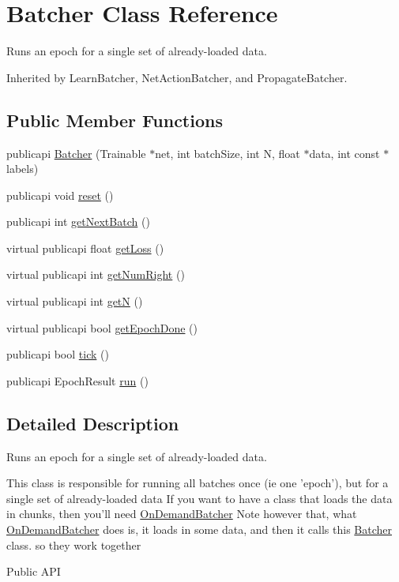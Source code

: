 \hypertarget{classBatcher}{\section{Batcher Class Reference}
\label{classBatcher}
}


Runs an epoch for a single set of already-\/loaded data.  




Inherited by Learn\-Batcher, Net\-Action\-Batcher, and Propagate\-Batcher.

\subsection*{Public Member Functions}
\begin{DoxyCompactItemize}
\item 
publicapi \hyperlink{classBatcher_a4a53928e1ea4f752953ea43ab7faa0e8}{Batcher} (Trainable $\ast$net, int batch\-Size, int N, float $\ast$data, int const $\ast$labels)
\item 
publicapi void \hyperlink{classBatcher_a0f3c13ade8b4840d87a43167a7341070}{reset} ()
\item 
publicapi int \hyperlink{classBatcher_ab26dca3a4d002664f0a13c68ddc65ced}{get\-Next\-Batch} ()
\item 
virtual publicapi float \hyperlink{classBatcher_afaafa92c67a361127079ba8b3003e0f2}{get\-Loss} ()
\item 
virtual publicapi int \hyperlink{classBatcher_a5426a711b8a6989f57fa1c6dad2e1138}{get\-Num\-Right} ()
\item 
virtual publicapi int \hyperlink{classBatcher_ae1bcb776d55a399fc91ef70b43b753d5}{get\-N} ()
\item 
virtual publicapi bool \hyperlink{classBatcher_a9f71c218e242b55bcd490379cc20e7ac}{get\-Epoch\-Done} ()
\item 
publicapi bool \hyperlink{classBatcher_afb1f812a7b9b3e45ae57d235c912d754}{tick} ()
\item 
publicapi Epoch\-Result \hyperlink{classBatcher_a51d5f36d326bdc32926abd8aa5b0d22e}{run} ()
\end{DoxyCompactItemize}


\subsection{Detailed Description}
Runs an epoch for a single set of already-\/loaded data. 

This class is responsible for running all batches once (ie one 'epoch'), but for a single set of already-\/loaded data If you want to have a class that loads the data in chunks, then you'll need \hyperlink{classOnDemandBatcher}{On\-Demand\-Batcher} Note however that, what \hyperlink{classOnDemandBatcher}{On\-Demand\-Batcher} does is, it loads in some data, and then it calls this \hyperlink{classBatcher}{Batcher} class. so they work together \begin{DoxyParagraph}{Public A\-P\-I}

\end{DoxyParagraph}


